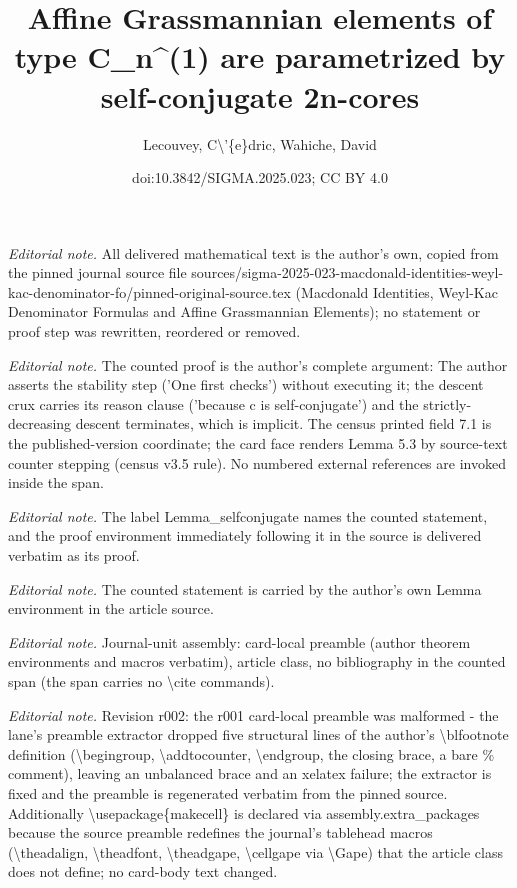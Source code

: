 \documentclass[10pt,a4paper]{article}
\title{Affine Grassmannian elements of type C\_n\textasciicircum{}(1) are parametrized by self-conjugate 2n-cores}
\author{Lecouvey, C\textbackslash{}'\{e\}dric, Wahiche, David}
\date{doi:10.3842/SIGMA.2025.023; CC BY 4.0}
\numberwithin{equation}{section}
\begin{document}
\maketitle
\setcounter{section}{5}
\setcounter{Theorem}{2}
\noindent\textit{Editorial note.} All delivered mathematical text is the author's own, copied from the pinned journal source file sources/sigma-2025-023-macdonald-identities-weyl-kac-denominator-fo/pinned-original-source.tex (Macdonald Identities, Weyl-Kac Denominator Formulas and Affine Grassmannian Elements); no statement or proof step was rewritten, reordered or removed.\par\medskip
\noindent\textit{Editorial note.} The counted proof is the author's complete argument: The author asserts the stability step ('One first checks') without executing it; the descent crux carries its reason clause ('because c is self-conjugate') and the strictly-decreasing descent terminates, which is implicit. The census printed field 7.1 is the published-version coordinate; the card face renders Lemma 5.3 by source-text counter stepping (census v3.5 rule). No numbered external references are invoked inside the span.\par\medskip
\noindent\textit{Editorial note.} The label Lemma\_selfconjugate names the counted statement, and the proof environment immediately following it in the source is delivered verbatim as its proof.\par\medskip
\noindent\textit{Editorial note.} The counted statement is carried by the author's own Lemma environment in the article source.\par\medskip
\noindent\textit{Editorial note.} Journal-unit assembly: card-local preamble (author theorem environments and macros verbatim), article class, no bibliography in the counted span (the span carries no \textbackslash{}cite commands).\par\medskip
\noindent\textit{Editorial note.} Revision r002: the r001 card-local preamble was malformed - the lane's preamble extractor dropped five structural lines of the author's \textbackslash{}blfootnote definition (\textbackslash{}begingroup, \textbackslash{}addtocounter, \textbackslash{}endgroup, the closing brace, a bare \% comment), leaving an unbalanced brace and an xelatex failure; the extractor is fixed and the preamble is regenerated verbatim from the pinned source. Additionally \textbackslash{}usepackage\{makecell\} is declared via assembly.extra\_packages because the source preamble redefines the journal's tablehead macros (\textbackslash{}theadalign, \textbackslash{}theadfont, \textbackslash{}theadgape, \textbackslash{}cellgape via \textbackslash{}Gape) that the article class does not define; no card-body text changed.\par\medskip
\end{document}
